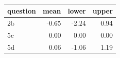 \begin{table}[ht]
\centering
\begin{tabular}{lrrr}
 question & mean & lower & upper \\ 
  \hline
2b & -0.65 & -2.24 & 0.94 \\ 
  5c & 0.00 & 0.00 & 0.00 \\ 
  5d & 0.06 & -1.06 & 1.19 \\ 
  \end{tabular}
\end{table}
